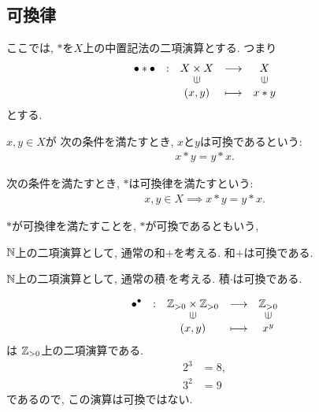 \subsection{可換律}
ここでは,
$\ast$を$X$上の中置記法の二項演算とする.
つまり
\begin{align*}
  \shazo{\bullet\ast\bullet}
        {X\times X}{X}
        {(x,y)}{x\ast y}
\end{align*}
とする.
\begin{definition}
  $x,y\in X$が
  次の条件を満たすとき,
  $x$と$y$は可換であるという:
  \begin{align*}
    x\ast y=y\ast x.
  \end{align*}
\end{definition}
\begin{definition}
  次の条件を満たすとき,
  $\ast$は可換律を満たすという:
  \begin{align*}
    x,y\in X\implies x\ast y=y\ast x.
  \end{align*}
\end{definition}
\begin{remark}
  $\ast$が可換律を満たすことを,
  $\ast$が可換であるともいう,
\end{remark}
\begin{example}
  $\mathbb{N}$上の二項演算として,
  通常の和$+$を考える.
  和$+$は可換である.
\end{example}
\begin{example}
  $\mathbb{N}$上の二項演算として,
  通常の積$\cdot$を考える.
  積$\cdot$は可換である.
\end{example}
\begin{nonexample}
\begin{align*}
  \shazo{\bullet^\bullet}
        {\ZZ_{>0}\times \ZZ_{>0}}{\ZZ_{>0}}
        {(x,y)}{x^y}
\end{align*}
は
$\mathbb{Z}_{>0}$上の二項演算である.
\begin{align*}
  2^3&=8,\\
  3^2&=9
\end{align*}
であるので,
この演算は可換ではない.
\end{nonexample}
